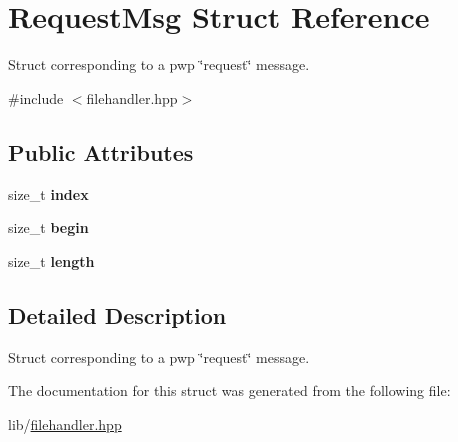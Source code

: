 \hypertarget{structRequestMsg}{}\section{Request\+Msg Struct Reference}
\label{structRequestMsg}


Struct corresponding to a pwp \char`\"{}request\char`\"{} message.  




{\ttfamily \#include $<$filehandler.\+hpp$>$}

\subsection*{Public Attributes}
\begin{DoxyCompactItemize}
\item 
\mbox{\label{structRequestMsg_a7f20219554383b1ed60aed8acec7a287}} 
size\+\_\+t {\bfseries index}
\item 
\mbox{\label{structRequestMsg_a6197b604a388f266a963c3011114092c}} 
size\+\_\+t {\bfseries begin}
\item 
\mbox{\label{structRequestMsg_a764a4087dfa01afbf2eaedd31c4695f1}} 
size\+\_\+t {\bfseries length}
\end{DoxyCompactItemize}


\subsection{Detailed Description}
Struct corresponding to a pwp \char`\"{}request\char`\"{} message. 

The documentation for this struct was generated from the following file\+:\begin{DoxyCompactItemize}
\item 
lib/\hyperlink{filehandler_8hpp}{filehandler.\+hpp}\end{DoxyCompactItemize}
